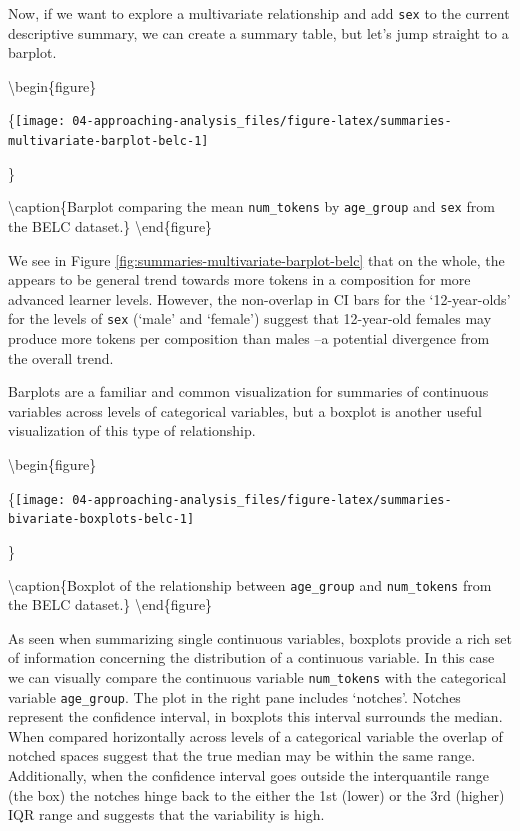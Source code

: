 \documentclass[
]{article}
\begin{document}
Now, if we want to explore a multivariate relationship and add \texttt{sex} to the current descriptive summary, we can create a summary table, but let's jump straight to a barplot.

\textbackslash begin\{figure\}

\{\centering \texttt{[image: 04-approaching-analysis\_files/figure-latex/summaries-multivariate-barplot-belc-1]}

\}

\textbackslash caption\{Barplot comparing the mean \texttt{num\_tokens} by \texttt{age\_group} and \texttt{sex} from the BELC dataset.\}\label{fig:summaries-multivariate-barplot-belc}
\textbackslash end\{figure\}

We see in Figure \ref{fig:summaries-multivariate-barplot-belc} that on the whole, the appears to be general trend towards more tokens in a composition for more advanced learner levels. However, the non-overlap in CI bars for the `12-year-olds' for the levels of \texttt{sex} (`male' and `female') suggest that 12-year-old females may produce more tokens per composition than males --a potential divergence from the overall trend.

Barplots are a familiar and common visualization for summaries of continuous variables across levels of categorical variables, but a boxplot is another useful visualization of this type of relationship.

\textbackslash begin\{figure\}

\{\centering \texttt{[image: 04-approaching-analysis\_files/figure-latex/summaries-bivariate-boxplots-belc-1]}

\}

\textbackslash caption\{Boxplot of the relationship between \texttt{age\_group} and \texttt{num\_tokens} from the BELC dataset.\}\label{fig:summaries-bivariate-boxplots-belc}
\textbackslash end\{figure\}

As seen when summarizing single continuous variables, boxplots provide a rich set of information concerning the distribution of a continuous variable. In this case we can visually compare the continuous variable \texttt{num\_tokens} with the categorical variable \texttt{age\_group}. The plot in the right pane includes `notches'. Notches represent the confidence interval, in boxplots this interval surrounds the median. When compared horizontally across levels of a categorical variable the overlap of notched spaces suggest that the true median may be within the same range.
Additionally, when the confidence interval goes outside the interquantile range (the box) the notches hinge back to the either the 1st (lower) or the 3rd (higher) IQR range and suggests that the variability is high.
\end{document}
